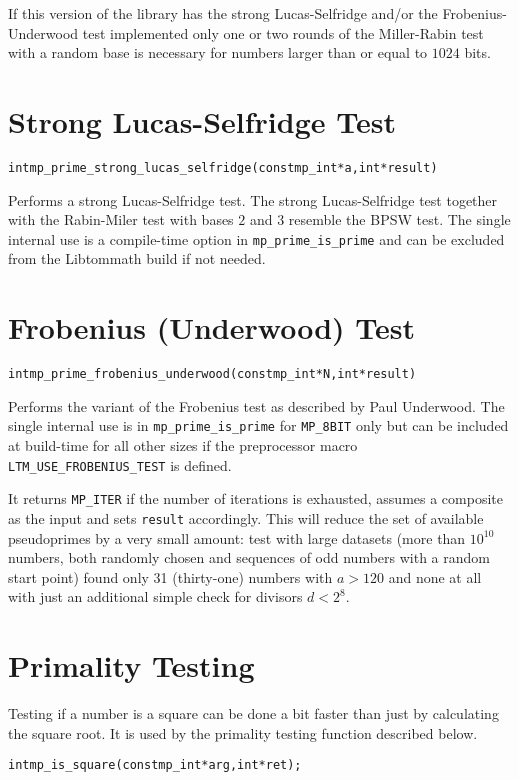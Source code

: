 \documentclass[synpaper]{book}
\begin{document}
If this version of the library has the strong Lucas-Selfridge and/or the Frobenius-Underwood test implemented only one or two rounds of the Miller-Rabin test with a random base is necessary for numbers larger than or equal to $1024$ bits.


\section{Strong Lucas-Selfridge Test}
\begin{alltt}
int mp_prime_strong_lucas_selfridge(const mp_int *a, int *result)
\end{alltt}
Performs a strong Lucas-Selfridge test. The strong Lucas-Selfridge test together with the Rabin-Miler test with bases $2$ and $3$ resemble the BPSW test. The single internal use is a compile-time option in \texttt{mp\_prime\_is\_prime} and can be excluded
from the Libtommath build if not needed.

\section{Frobenius (Underwood)  Test}
\begin{alltt}
int mp_prime_frobenius_underwood(const mp_int *N, int *result)
\end{alltt}
Performs the variant of the Frobenius test as described by Paul Underwood. The single internal use is in
\texttt{mp\_prime\_is\_prime} for \texttt{MP\_8BIT} only but can be included at build-time for all other sizes
if the preprocessor macro \texttt{LTM\_USE\_FROBENIUS\_TEST} is defined.

It returns \texttt{MP\_ITER} if the number of iterations is exhausted, assumes a composite as the input and sets \texttt{result} accordingly. This will reduce the set of available pseudoprimes by a very small amount: test with large datasets (more than $10^{10}$ numbers, both randomly chosen and sequences of odd numbers with a random start point) found only 31 (thirty-one) numbers with $a > 120$ and none at all with just an additional simple check for divisors $d < 2^8$.

\section{Primality Testing}
Testing if a number is a square can be done a bit faster than just by calculating the square root. It is used by the primality testing function described below.
\begin{alltt}
int mp_is_square(const mp_int *arg, int *ret);
\end{alltt}
\end{document}
